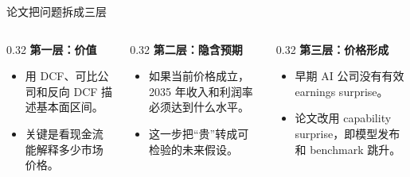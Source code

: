 \documentclass[aspectratio=169,11pt]{beamer}
\begin{document}
\begin{frame}{论文把问题拆成三层}
  \begin{columns}[T,onlytextwidth]
    \begin{column}{0.32\textwidth}
      \textbf{第一层：价值}
      \begin{itemize}
        \item 用 DCF、可比公司和反向 DCF 描述基本面区间。
        \item 关键是看现金流能解释多少市场价格。
      \end{itemize}
    \end{column}
    \begin{column}{0.32\textwidth}
      \textbf{第二层：隐含预期}
      \begin{itemize}
        \item 如果当前价格成立，2035 年收入和利润率必须达到什么水平。
        \item 这一步把“贵”转成可检验的未来假设。
      \end{itemize}
    \end{column}
    \begin{column}{0.32\textwidth}
      \textbf{第三层：价格形成}
      \begin{itemize}
        \item 早期 AI 公司没有有效 earnings surprise。
        \item 论文改用 capability surprise，即模型发布和 benchmark 跳升。
      \end{itemize}
    \end{column}
  \end{columns}
\end{frame}
\end{document}

